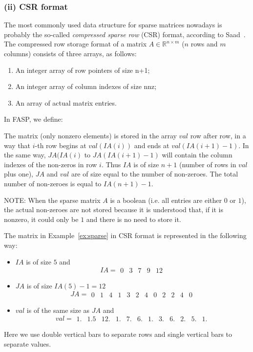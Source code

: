 \documentclass[11pt]{memoir}
\begin{document}
\subsubsection*{(ii) CSR format}
The most commonly used data structure for sparse matrices nowadays is probably the so-called {\em compressed sparse row}  (CSR) format, according to Saad~\cite{Saad.Saad.2003fv}. The compressed row storage format of a matrix $A\in \mathbb{R}^{n\times m}$ ($n$ rows and $m$ columns) consists of three arrays, as follows:
%
\begin{enumerate}
\item An integer array of row pointers of size n+1;
\item An integer array of column indexes of size nnz;
\item An array of actual matrix entries.
\end{enumerate}
%
In FASP, we define:
%

%

The matrix ({only nonzero elements}) is stored in the array $val$
row after row, in a way that $i$-th row begins at $val(IA(i))$ and ends
at $val(IA(i+1)-1)$. In the same way, $JA(IA(i)$ to $JA(IA(i+1)-1)$ will
contain the column indexes of the non-zeros in row $i$. Thus $IA$ is of
size $n+1$ (number of rows in $val$ plus one), $JA$ and $val$ are of size
equal to the number of non-zeroes. The total number of non-zeroes is
equal to $IA(n+1)-1$.

\begin{snugshade}\noindent
NOTE: When the sparse matrix $A$ is a boolean (i.e. all entries are either $0$ or
$1$), the actual non-zeroes are not stored because it is understood that, if it is
nonzero, it could only be $1$ and there is no need to store it.
\end{snugshade}

The matrix in Example~\ref{ex:sparse} in CSR format is represented in the following way:
\begin{itemize}
\item $IA$ is of size $5$ and
$$IA =
\begin{array}{||c||c||c||c||c||}0&3&7&9&12\end{array}
$$
\item $JA$ is of size $IA(5)-1=12$
$$JA =
\begin{array}{||c|c|c||c|c|c|c||c|c||c|c|c||}
0&1&4&1&3&2&4&0&2&2&4&0
\end{array}
$$
\item $val$ is of the same size as $JA$ and
$$val =
\begin{array}{||c|c|c||c|c|c|c||c|c||c|c|c||}
1.&1.5&12.&1.&7.&6.&1.&3.&6.&2.&5.&1.
\end{array}
$$
\end{itemize}
Here we use double vertical bars to separate rows and single vertical bars to separate values.
\end{document}
